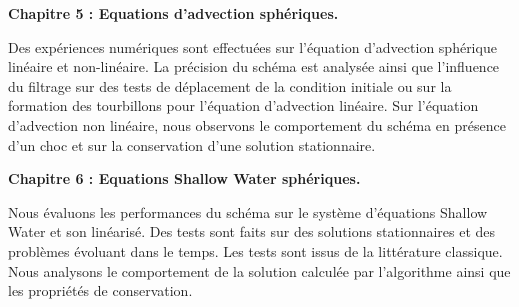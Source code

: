 \vspace{0.7cm}
\textbf{Chapitre 5 : Equations d'advection sphériques.}

Des expériences numériques sont effectuées sur l'équation d'advection sphérique linéaire et non-linéaire. La précision du schéma est analysée ainsi que l'influence du filtrage sur des tests de déplacement de la condition initiale ou sur la formation des tourbillons pour l'équation d'advection linéaire. Sur l'équation d'advection non linéaire, nous observons le comportement du schéma en présence d'un choc et sur la conservation d'une solution stationnaire.  







\vspace{0.7cm}
\textbf{Chapitre 6 : Equations Shallow Water sphériques.}

Nous évaluons les performances du schéma sur le système d'équations Shallow Water et son linéarisé. Des tests sont faits sur des solutions stationnaires et des problèmes évoluant dans le temps. Les tests sont issus de la littérature classique. Nous analysons le comportement de la solution calculée par l'algorithme ainsi que les propriétés de conservation.

